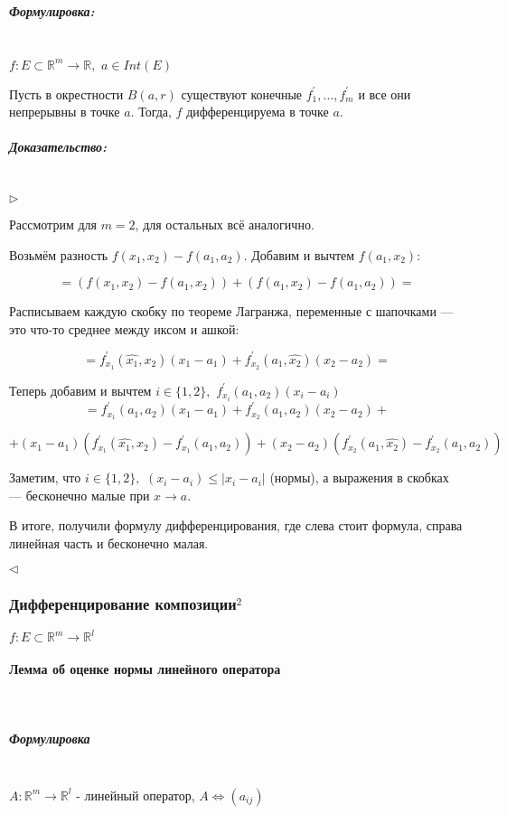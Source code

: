 \documentclass{article}
\def\dbl{\,\,}
\let\vanillaparagraph\paragraph
\let\vanillasubparagraph\subparagraph
\renewcommand{\paragraph}[1]{\vanillaparagraph{#1}\mbox{}\\}
\renewcommand{\subparagraph}[1]{\vanillasubparagraph{#1}\mbox{}\\}
\begin{document}
\subparagraph{Формулировка: }

$f : E \subset \mathbb{R}^m \rightarrow \mathbb{R}, \dbl a \in Int(E)$

Пусть в окрестности $B(a, r)$ существуют конечные $f^\prime_1, \ldots, f^\prime_m$ и все они непрерывны в точке $a$. Тогда, $f$ дифференцируема в точке $a$.

\subparagraph{Доказательство: }

$\rhd$

Рассмотрим для $m = 2$, для остальных всё аналогично.

Возьмём разность $f(x_1, x_2) - f(a_1, a_2)$. Добавим и вычтем $f(a_1, x_2)$:

\[ = \left(f(x_1, x_2) - f(a_1, x_2)\right) + \left(f(a_1, x_2) - f(a_1, a_2)\right) = \]

Расписываем каждую скобку по теореме Лагранжа, переменные с шапочками --- это что-то среднее между иксом и ашкой:

\[ = f^\prime_{x_1}(\hat{x_1}, x_2)(x_1 - a_1) + f^\prime_{x_2}(a_1, \hat{x_2})(x_2 - a_2) = \]

Теперь добавим и вычтем $i \in \{1, 2\}, \dbl f^\prime_{x_i}(a_1, a_2)(x_i - a_i)$
\[ = f^\prime_{x_1}(a_1, a_2)(x_1 - a_1) + f^\prime_{x_2}(a_1, a_2)(x_2 - a_2) + \]

\[+ (x_1 - a_1)(f^\prime_{x_1}(\hat{x_1}, x_2) - f^\prime_{x_1}(a_1, a_2)) + (x_2 - a_2)(f^\prime_{x_2}(a_1, \hat{x_2}) - f^\prime_{x_2}(a_1, a_2))\]

Заметим, что $i \in \{1, 2\}, \dbl (x_i - a_i) \le |x_i - a_i|$ (нормы), а выражения в скобках --- бесконечно малые при $x \rightarrow a$.

В итоге, получили формулу дифференцирования, где слева стоит формула, справа линейная часть и бесконечно малая.

$\lhd$

\subsubsection{Дифференцирование композиции\texorpdfstring{$^2$}{}}

$f: E \subset \mathbb R^m \to \mathbb R^l$

\paragraph{Лемма об оценке нормы линейного оператора}
\subparagraph{Формулировка}

$A: \mathbb R^m \to \mathbb R^l$ - линейный оператор, $A \Leftrightarrow (a_{ij})$
\end{document}
